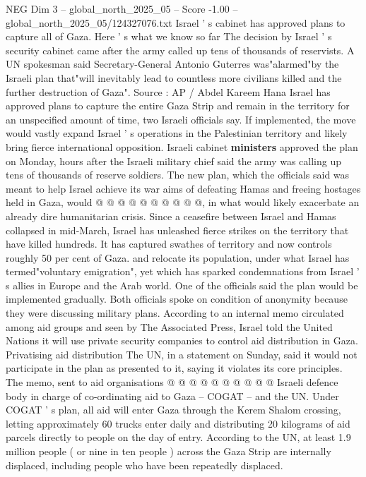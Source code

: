 \begin{textsample}{NEG Dim 3 – global\_north\_2025\_05 – Score -1.00 – global\_north\_2025\_05/124327076.txt}  \label{ex:f3_neg_316}
Israel ' s cabinet has approved plans to capture all of Gaza.
Here ' s what we know so far The decision by Israel ' s security cabinet came after the army called up tens of thousands of reservists.
A UN spokesman said Secretary-General Antonio Guterres was"alarmed"by the Israeli plan that"will inevitably lead to countless more civilians killed and the further destruction of Gaza".
Source : AP / Abdel Kareem Hana Israel has approved plans to capture the entire Gaza Strip and remain in the territory for an unspecified amount of time, two Israeli officials say.
If implemented, the move would vastly expand Israel ' s operations in the Palestinian territory and likely bring fierce international opposition.
Israeli cabinet \textbf{ministers} approved the plan on Monday, hours after the Israeli military chief said the army was calling up tens of thousands of reserve soldiers.
The new plan, which the officials said was meant to help Israel achieve its war aims of defeating Hamas and freeing hostages held in Gaza, would @ @ @ @ @ @ @ @ @ @, in what would likely exacerbate an already dire humanitarian crisis.
Since a ceasefire between Israel and Hamas collapsed in mid-March, Israel has unleashed fierce strikes on the territory that have killed hundreds.
It has captured swathes of territory and now controls roughly 50 per cent of Gaza. and relocate its population, under what Israel has termed"voluntary emigration", yet which has sparked condemnations from Israel ' s allies in Europe and the Arab world.
One of the officials said the plan would be implemented gradually.
Both officials spoke on condition of anonymity because they were discussing military plans.
According to an internal memo circulated among aid groups and seen by The Associated Press, Israel told the United Nations it will use private security companies to control aid distribution in Gaza.
Privatising aid distribution The UN, in a statement on Sunday, said it would not participate in the plan as presented to it, saying it violates its core principles.
The memo, sent to aid organisations @ @ @ @ @ @ @ @ @ @ Israeli defence body in charge of co-ordinating aid to Gaza -- COGAT -- and the UN.
Under COGAT ' s plan, all aid will enter Gaza through the Kerem Shalom crossing, letting approximately 60 trucks enter daily and distributing 20 kilograms of aid parcels directly to people on the day of entry.
According to the UN, at least 1.9 million people ( or nine in ten people ) across the Gaza Strip are internally displaced, including people who have been repeatedly displaced.

\end{textsample}
